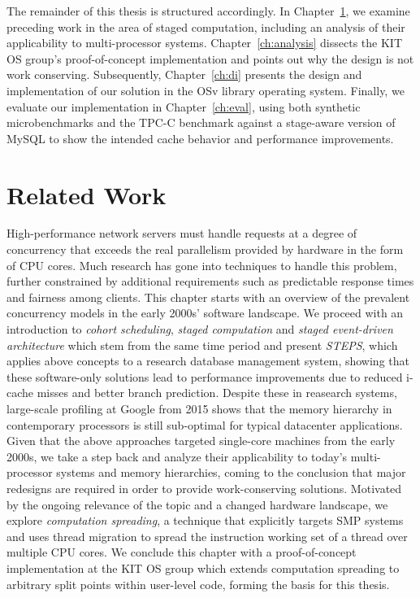 \documentclass[12pt,a4paper]{book}
\begin{document}
The remainder of this thesis is structured accordingly.
In Chapter~\ref{ch:relwork}, we examine preceding work in the area of staged computation, including an analysis of their applicability to multi-processor systems.
Chapter~\ref{ch:analysis} dissects the KIT OS group's proof-of-concept implementation and points out why the design is not work conserving.
Subsequently, Chapter~\ref{ch:di} presents the design and implementation of our solution in the OSv library operating system.
Finally, we evaluate our implementation in Chapter~\ref{ch:eval}, using both synthetic microbenchmarks and the TPC-C benchmark against a stage-aware version of MySQL to show the intended cache behavior and performance improvements.


\chapter{Related Work}\label{ch:relwork}
High-performance network servers must handle requests at a degree of concurrency that exceeds the real parallelism provided by hardware in the form of CPU cores.
Much research has gone into techniques to handle this problem, further constrained by additional requirements such as predictable response times and fairness among clients.
This chapter starts with an overview of the prevalent concurrency models in the early 2000s' software landscape.
We proceed with an introduction to \emph{cohort scheduling}, \emph{staged computation} and \emph{staged event-driven architecture} which stem from the same time period
and present \emph{STEPS}, which applies above concepts to a research database management system, showing that these software-only solutions lead to performance improvements due to reduced i-cache misses and better branch prediction.
Despite these in reasearch systems, large-scale profiling at Google from 2015 shows that the memory hierarchy in contemporary processors is still sub-optimal for typical datacenter applications.
Given that the above approaches targeted single-core machines from the early 2000s, we take a step back and analyze their applicability to today's multi-processor systems and memory hierarchies,
coming to the conclusion that major redesigns are required in order to provide work-conserving solutions.
Motivated by the ongoing relevance of the topic and a changed hardware landscape, we explore \emph{computation spreading}, a technique that explicitly targets SMP systems and uses thread migration to spread the instruction working set of a thread over multiple CPU cores.
We conclude this chapter with a proof-of-concept implementation at the KIT OS group which extends computation spreading to arbitrary split points within user-level code, forming the basis for this thesis.
\end{document}
